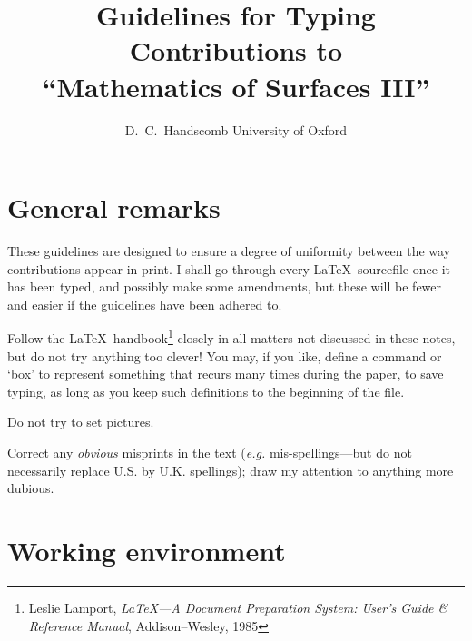 %
 
\title{Guidelines for Typing Contributions to\\
``Mathematics of Surfaces III''}
 
\author{D.~C.~Handscomb \affil University of Oxford}
 
 
\numberedbib
 

 
\maketitle
 
\sloppy
 
\section{General remarks}\label{s1}
 
These guidelines are designed to ensure a degree of uniformity between the
way contributions appear in print.  I shall go through every \LaTeX\
sourcefile once it has been typed, and possibly make some amendments, but
these will be fewer and easier if the guidelines have been adhered to.
 
Follow the \LaTeX\ handbook\footnote{Leslie Lamport, {\em \LaTeX---A
Document Preparation System: User's Guide \& Reference Manual},
Addison--Wesley, 1985} closely in all matters not discussed in these notes,
but do not try anything too clever!  You may, if you like, define a command
or `box' to represent something that recurs many times during the paper, to
save typing, as long as you keep such definitions to the beginning of the
file.
 
Do not try to set pictures.
 
Correct any {\em obvious} misprints in the text ({\em e.g.}
mis-spell\-ings---but do not necessarily replace U.S. by U.K. spellings);
draw my attention to anything more dubious.
 
\section{Working environment}\label{s2}
 
